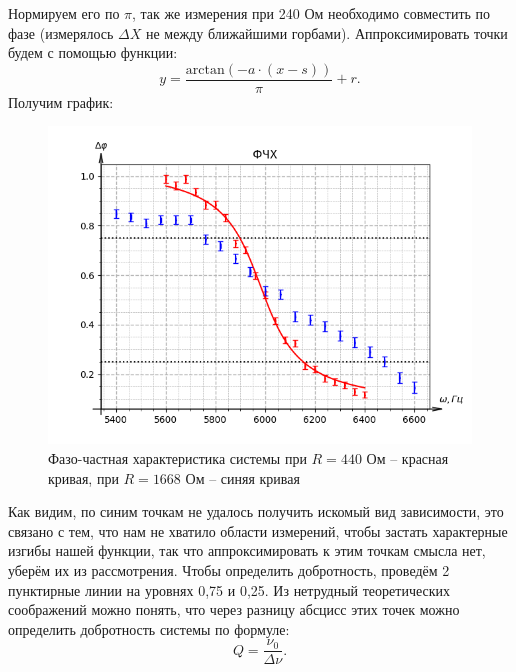 \documentclass[a4paper,12pt]{extarticle}
\begin{document}
Нормируем его по $\pi$, так же измерения при 240 Ом необходимо совместить по фазе (измерялось $\Delta X$ не между ближайшими горбами). Аппроксимировать точки будем с помощью функции: $$y = \frac{\text{arctan}(-a\cdot (x - s))}{\pi} + r.$$ Получим график:

\begin{figure}[h!]
    \centering
    \includegraphics[width=0.8\linewidth]{FCHH.png}
    \caption{Фазо-частная характеристика системы при $R = 440$ Ом -- красная кривая, при $R = 1668$ Ом -- синяя кривая}
\end{figure}

Как видим, по синим точкам не удалось получить искомый вид зависимости, это связано с тем, что нам не хватило области измерений, чтобы застать характерные изгибы нашей функции, так что аппроксимировать к этим точкам смысла нет, уберём их из рассмотрения. Чтобы определить добротность, проведём 2 пунктирные линии на уровнях 0,75 и 0,25. Из нетрудный теоретических соображений можно понять, что через разницу абсцисс этих точек можно определить добротность системы по формуле:
\begin{equation}
    Q = \frac{\nu_0}{\Delta \nu}.
\end{equation}



\end{document}
